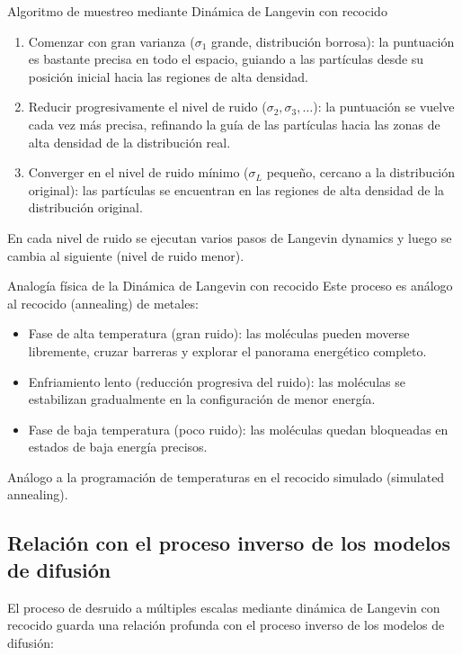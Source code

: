 \begin{importantbox}{Algoritmo de muestreo mediante Dinámica de Langevin con recocido}
\begin{enumerate}
    \item Comenzar con gran varianza ($\sigma_1$ grande, distribución borrosa): la puntuación es bastante precisa en todo el espacio, guiando a las partículas desde su posición inicial hacia las regiones de alta densidad.
    \item Reducir progresivamente el nivel de ruido ($\sigma_2, \sigma_3, \ldots$): la puntuación se vuelve cada vez más precisa, refinando la guía de las partículas hacia las zonas de alta densidad de la distribución real.
    \item Converger en el nivel de ruido mínimo ($\sigma_L$ pequeño, cercano a la distribución original): las partículas se encuentran en las regiones de alta densidad de la distribución original.
\end{enumerate}
En cada nivel de ruido se ejecutan varios pasos de Langevin dynamics y luego se cambia al siguiente (nivel de ruido menor).
\end{importantbox}

\begin{knowledgebox}{Analogía física de la Dinámica de Langevin con recocido}
Este proceso es análogo al recocido (annealing) de metales:
\begin{itemize}
    \item Fase de alta temperatura (gran ruido): las moléculas pueden moverse libremente, cruzar barreras y explorar el panorama energético completo.
    \item Enfriamiento lento (reducción progresiva del ruido): las moléculas se estabilizan gradualmente en la configuración de menor energía.
    \item Fase de baja temperatura (poco ruido): las moléculas quedan bloqueadas en estados de baja energía precisos.
\end{itemize}
Análogo a la programación de temperaturas en el recocido simulado (simulated annealing).
\end{knowledgebox}

\subsection{Relación con el proceso inverso de los modelos de difusión}

El proceso de desruido a múltiples escalas mediante dinámica de Langevin con recocido guarda una relación profunda con el proceso inverso de los modelos de difusión:

